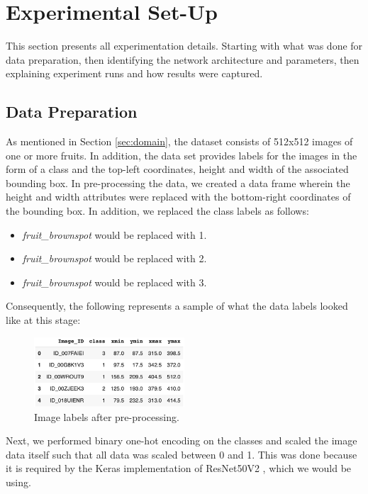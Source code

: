 \section{Experimental Set-Up} \label{sec:experiment}

This section presents all experimentation details. Starting with what was done for data preparation, then identifying the network architecture and parameters, then explaining experiment runs and how results were captured.

\subsection{Data Preparation}
As mentioned in Section \ref{sec:domain}, the dataset consists of 512x512 images of one or more fruits. In addition, the data set provides labels for the images in the form of a class and the top-left coordinates, height and width of the associated bounding box. In pre-processing the data, we created a data frame wherein the height and width attributes were replaced with the bottom-right coordinates of the bounding box. In addition, we replaced the class labels as follows:
\begin{itemize}
    \item \emph{fruit\_brownspot} would be replaced with 1.
    \item \emph{fruit\_brownspot} would be replaced with 2.
    \item \emph{fruit\_brownspot} would be replaced with 3.
\end{itemize}

Consequently, the following represents a sample of what the data labels looked like at this stage:

\begin{figure}[htbp]
\centerline{\includegraphics[width=0.5\textwidth]{report/4_experimental/data.png}}
\caption{Image labels after pre-processing.}
\label{fig:data}
\end{figure}

Next, we performed binary one-hot encoding on the classes and scaled the image data itself such that all data was scaled between 0 and 1. This was done because it is required by the Keras \cite{keras} implementation of ResNet50V2 \cite{ResNet50V2}, which we would be using.

